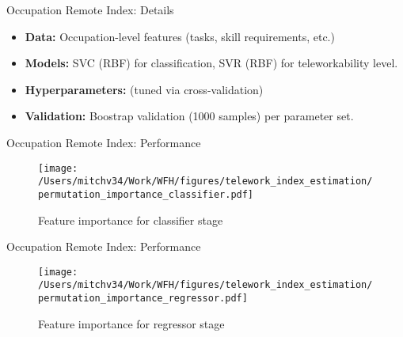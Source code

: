 \documentclass[aspectratio=1610]{beamer}
\begin{document}
\begin{frame}[label=appendix_remote_index_details]{Occupation Remote Index: Details}
 \begin{itemize}
    \item \textbf{Data:} Occupation-level features (tasks, skill requirements, etc.)
    \item \textbf{Models:} SVC (RBF) for classification, SVR (RBF) for teleworkability level.
    \item \textbf{Hyperparameters:} (tuned via cross-validation)
    \item \textbf{Validation:} Boostrap validation (1000 samples) per parameter set.
  \end{itemize}

  \hyperlink{empiric_remote_index1}{}
\end{frame}


\begin{frame}[label=appendix_remote_index_performance_feature_importance_classifier]{Occupation Remote Index: Performance}
    \begin{figure}
        \centering
        \texttt{[image: /Users/mitchv34/Work/WFH/figures/telework\_index\_estimation/permutation\_importance\_classifier.pdf]}
        \caption{Feature importance for classifier stage}
    \end{figure}

    \hyperlink{empiric_remote_index1}{}
\end{frame}

\begin{frame}[label=appendix_remote_index_performance_feature_importance_regressor]{Occupation Remote Index: Performance}

    \begin{figure}
        \centering
        \texttt{[image: /Users/mitchv34/Work/WFH/figures/telework\_index\_estimation/permutation\_importance\_regressor.pdf]}
        \caption{Feature importance for regressor stage}
    \end{figure}

    \hyperlink{empiric_remote_index1}{}
\end{frame}
\end{document}
